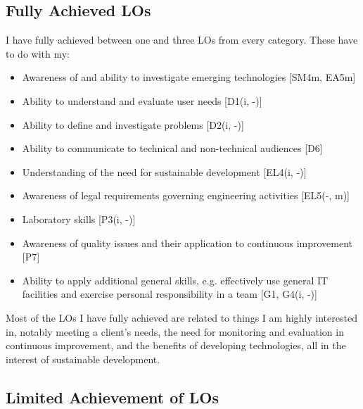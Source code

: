 \subsection*{Fully Achieved LOs}

I have fully achieved between one and three LOs from every category.
These have to do with my:
\begin{itemize}
	\item Awareness of and ability to investigate emerging technologies [SM4m, EA5m]
	\item Ability to understand and evaluate user needs [D1(i, -)]
	\item Ability to define and investigate problems [D2(i, -)]
	\item Ability to communicate to technical and non-technical audiences [D6]
	\item Understanding of the need for sustainable development [EL4(i, -)]
	\item Awareness of legal requirements governing engineering activities [EL5(-, m)]
	\item Laboratory skills [P3(i, -)]
	\item Awareness of quality issues and their application to continuous improvement [P7]
	\item Ability to apply additional general skills, e.g. effectively use general IT facilities and exercise personal responsibility in a team [G1, G4(i, -)]
\end{itemize}

Most of the LOs I have fully achieved are related to things I am highly interested in, notably meeting a client's needs, the need for monitoring and evaluation in continuous improvement, and the benefits of developing technologies, all in the interest of sustainable development.




\subsection*{Limited Achievement of LOs}

